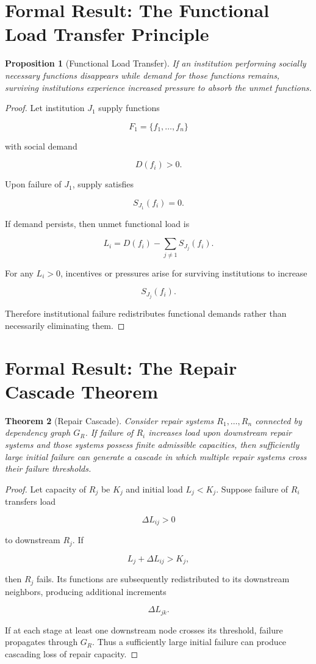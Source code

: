 \documentclass[11pt,oneside]{book}
\newtheorem{theorem}{Theorem}[chapter]
\newtheorem{proposition}[theorem]{Proposition}
\theoremstyle{definition}
\theoremstyle{remark}
\begin{document}
\section{Formal Result: The Functional Load Transfer Principle}

\begin{proposition}[Functional Load Transfer]
If an institution performing socially necessary functions disappears while demand for those functions remains, surviving institutions experience increased pressure to absorb the unmet functions.
\end{proposition}

\begin{proof}
Let institution \(J_1\) supply functions

\[
F_1=\{f_1,\ldots,f_n\}
\]

with social demand

\[
D(f_i)>0.
\]

Upon failure of \(J_1\), supply satisfies

\[
S_{J_1}(f_i)=0.
\]

If demand persists, then unmet functional load is

\[
L_i
=
D(f_i)-\sum_{j\neq1}S_{J_j}(f_i).
\]

For any \(L_i>0\), incentives or pressures arise for surviving institutions to increase

\[
S_{J_j}(f_i).
\]

Therefore institutional failure redistributes functional demands rather than necessarily eliminating them.
\end{proof}

\section{Formal Result: The Repair Cascade Theorem}

\begin{theorem}[Repair Cascade]
Consider repair systems \(R_1,\ldots,R_n\) connected by dependency graph \(G_R\). If failure of \(R_i\) increases load upon downstream repair systems and those systems possess finite admissible capacities, then sufficiently large initial failure can generate a cascade in which multiple repair systems cross their failure thresholds.
\end{theorem}

\begin{proof}
Let capacity of \(R_j\) be \(K_j\) and initial load \(L_j<K_j\). Suppose failure of \(R_i\) transfers load

\[
\Delta L_{ij}>0
\]

to downstream \(R_j\). If

\[
L_j+\Delta L_{ij}>K_j,
\]

then \(R_j\) fails. Its functions are subsequently redistributed to its downstream neighbors, producing additional increments

\[
\Delta L_{jk}.
\]

If at each stage at least one downstream node crosses its threshold, failure propagates through \(G_R\). Thus a sufficiently large initial failure can produce cascading loss of repair capacity.
\end{proof}
\end{document}
